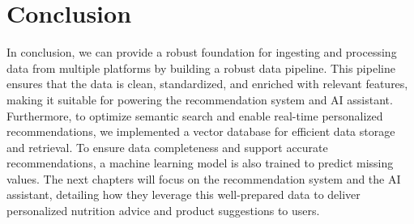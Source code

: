 \section*{Conclusion}
In conclusion, we can provide a robust foundation for ingesting and processing data from multiple platforms by building a robust data pipeline.
This pipeline ensures that the data is clean, standardized, and enriched
with relevant features, making it suitable for powering the recommendation system and AI assistant. Furthermore, to optimize semantic search
and enable real-time personalized recommendations, we implemented a vector database for efficient data storage and retrieval. To ensure data
completeness and support accurate recommendations, a machine learning model is also trained to predict missing values. 
The next chapters will focus on the recommendation system and the AI assistant, detailing how they leverage this well-prepared data to deliver personalized nutrition advice and product suggestions to users.